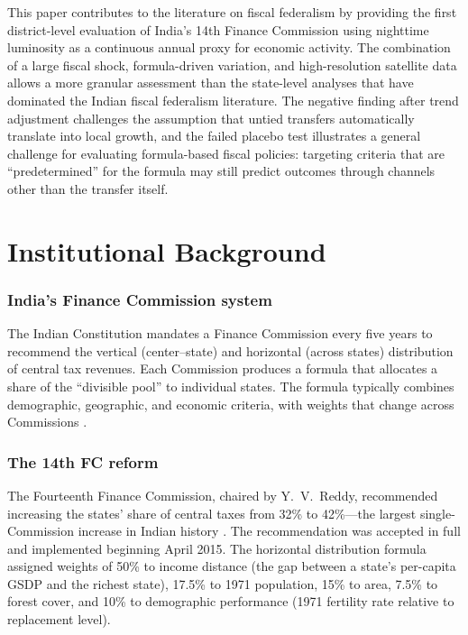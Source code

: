 \documentclass[12pt]{article}
\begin{document}
This paper contributes to the literature on fiscal federalism by providing the first district-level evaluation of India's 14th Finance Commission using nighttime luminosity as a continuous annual proxy for economic activity. The combination of a large fiscal shock, formula-driven variation, and high-resolution satellite data allows a more granular assessment than the state-level analyses that have dominated the Indian fiscal federalism literature. The negative finding after trend adjustment challenges the assumption that untied transfers automatically translate into local growth, and the failed placebo test illustrates a general challenge for evaluating formula-based fiscal policies: targeting criteria that are ``predetermined'' for the formula may still predict outcomes through channels other than the transfer itself.


\section{Institutional Background}

\subsubsection*{India's Finance Commission system} The Indian Constitution mandates a Finance Commission every five years to recommend the vertical (center--state) and horizontal (across states) distribution of central tax revenues. Each Commission produces a formula that allocates a share of the ``divisible pool'' to individual states. The formula typically combines demographic, geographic, and economic criteria, with weights that change across Commissions \citep{rao2005political}.

\subsubsection*{The 14th FC reform} The Fourteenth Finance Commission, chaired by Y.~V.~Reddy, recommended increasing the states' share of central taxes from 32\% to 42\%---the largest single-Commission increase in Indian history \citep{fc14report}. The recommendation was accepted in full and implemented beginning April 2015. The horizontal distribution formula assigned weights of 50\% to income distance (the gap between a state's per-capita GSDP and the richest state), 17.5\% to 1971 population, 15\% to area, 7.5\% to forest cover, and 10\% to demographic performance (1971 fertility rate relative to replacement level).
\end{document}
